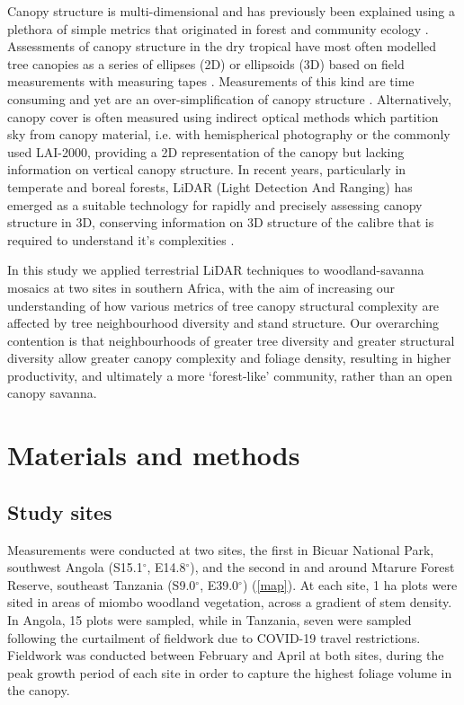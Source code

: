 \documentclass[11pt,a4paper]{article}
\begin{document}
Canopy structure is multi-dimensional and has previously been explained using a plethora of simple metrics that originated in forest and community ecology \citep{}. Assessments of canopy structure in the dry tropical have most often modelled tree canopies as a series of ellipses (2D) or ellipsoids (3D) based on field measurements with measuring tapes \citep{}. Measurements of this kind are time consuming and yet are an over-simplification of canopy structure \citep{}. Alternatively, canopy cover is often measured using indirect optical methods which partition sky from canopy material, i.e. with hemispherical photography or the commonly used LAI-2000, providing a 2D representation of the canopy but lacking information on vertical canopy structure. In recent years, particularly in temperate and boreal forests, LiDAR (Light Detection And Ranging) has emerged as a suitable technology for rapidly and precisely assessing canopy structure in 3D, conserving information on 3D structure of the calibre that is required to understand it's complexities \citep{}.

In this study we applied terrestrial LiDAR techniques to woodland-savanna mosaics at two sites in southern Africa, with the aim of increasing our understanding of how various metrics of tree canopy structural complexity are affected by tree neighbourhood diversity and stand structure. Our overarching contention is that neighbourhoods of greater tree diversity and greater structural diversity allow greater canopy complexity and foliage density, resulting in higher productivity, and ultimately a more `forest-like' community, rather than an open canopy savanna.

\section{Materials and methods}

\subsection{Study sites}

Measurements were conducted at two sites, the first in Bicuar National Park, southwest Angola (S15.1$^\circ$, E14.8$^\circ$), and the second in and around Mtarure Forest Reserve, southeast Tanzania (S9.0$^\circ$, E39.0$^\circ$) (\autoref{map}). At each site, 1 ha plots were sited in areas of miombo woodland vegetation, across a gradient of stem density. In Angola, 15 plots were sampled, while in Tanzania, seven were sampled following the curtailment of fieldwork due to COVID-19 travel restrictions. Fieldwork was conducted between February and April at both sites, during the peak growth period of each site in order to capture the highest foliage volume in the canopy.
\end{document}
